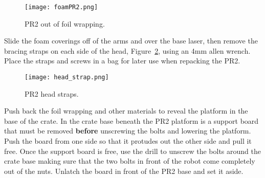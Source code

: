 \begin{figure}[h]
\centering
\texttt{[image: foamPR2.png]}
\caption{PR2 out of foil wrapping.}
\label{fig:foamPR2}
\end{figure}

Slide the foam coverings off of the arms and over the base laser, then remove
the bracing straps on each side of the head, Figure~\ref{fig:head_straps}, using
an 4mm allen wrench. Place the straps and screws in a bag for later use when
repacking the PR2.

\begin{figure}[h]
\centering
\texttt{[image: head\_strap.png]}
\caption{PR2 head straps.}
\label{fig:head_straps}
\end{figure}

Push back the foil wrapping and other materials to reveal the platform in the
base of the crate. In the crate base beneath the PR2 platform is a support board
that must be removed {\bf before} unscrewing the bolts and lowering the platform. Push
the board from one side so that it protudes out the other side and pull it
free. Once the support board is free, use the drill to unscrew the bolts around
the crate base making sure that the two bolts in front of the robot come
completely out of the nuts. Unlatch the board in front of the PR2 base and set
it aside.
